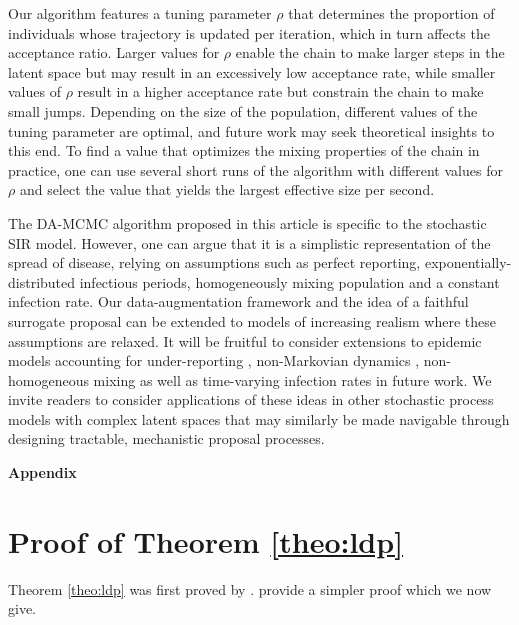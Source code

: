 \documentclass[12pt]{article}
\begin{document}
	Our algorithm features a tuning parameter $\rho$ that determines the proportion of individuals whose trajectory is updated per iteration, which in turn affects the acceptance ratio. Larger values for $\rho$ enable the chain to make larger steps in the latent space but may result in an excessively low acceptance rate, while smaller values of $\rho$ result in a higher acceptance rate but constrain the chain to make small jumps. Depending on the size of the population, different values of the tuning parameter are optimal, and future work may seek theoretical insights to this end. To find a value that optimizes the mixing properties of the chain in practice, one can use several short runs of the algorithm with different values for $\rho$ and select the value that yields the largest effective size per second.
	
	
	The DA-MCMC algorithm proposed in this article is specific to 
	the stochastic SIR model. However, one can argue that it is a simplistic representation of the spread of disease, relying on assumptions such as perfect reporting, exponentially-distributed infectious periods, homogeneously mixing population and a constant infection rate. Our data-augmentation framework and the idea of a faithful surrogate proposal can be extended to models of increasing realism where these assumptions are relaxed. It will be fruitful to consider extensions to epidemic models accounting for under-reporting \citep{Fintzi.2017,Morozova.2021}, non-Markovian dynamics \citep{Streftaris.2002}, non-homogeneous mixing \citep{Severo.1969,Lomeli.2021} as well as time-varying infection rates \citep{Kypraios.2018} in future work. We invite readers to consider applications of these ideas in other stochastic process models with complex latent spaces that may similarly be made navigable through designing tractable, mechanistic proposal processes.
	
	\appendix
	\begin{center} \Large{\bf Appendix}
	\end{center}
	
	\section{Proof of Theorem \ref{theo:ldp}}
	\label{app:ldp}
	
	Theorem \ref{theo:ldp} was first proved by \cite{Neuts.1971}. \cite{Ross.1996} provide a simpler proof which we now give.
	
\end{document}
